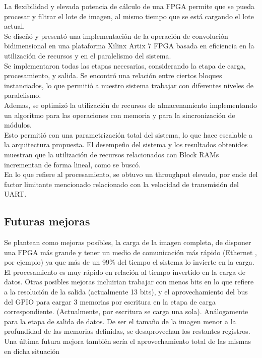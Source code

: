 \documentclass[a4paper]{article}
\begin{document}
La flexibilidad y elevada potencia de cálculo de una FPGA permite que se pueda
procesar y filtrar el lote de imagen, al mismo tiempo que se está cargando el lote
actual. \\

Se diseñó y presentó una implementación de la operación de convolución bidimensional en una
plataforma Xilinx Artix 7 FPGA basada en eficiencia en la utilización de recursos y en el paralelismo del sistema.\\
Se implementaron todas las etapas necesarias, considerando la etapa de carga, procesamiento, y salida. Se
encontró una relación entre ciertos bloques instanciados, lo que permitió a nuestro sistema trabajar con diferentes
niveles de paralelismo.\\

Ademas, se optimizó la utilización de recursos de almacenamiento implementando un algoritmo para las
operaciones con memoria y para la sincronización de módulos.\\
Esto permitió con una parametrización total del sistema, lo que hace escalable a la arquitectura propuesta.
El desempeño del sistema y los resultados obtenidos muestran que la utilización de recursos relacionados con
Block RAMs incrementan de forma lineal, como se buscó.\\

En lo que refiere al procesamiento, se obtuvo un throughput elevado, por ende del factor limitante mencionado relacionado 
con la velocidad de transmisión del UART.

\subsection{Futuras mejoras}
Se plantean como mejoras posibles, la carga de la imagen completa, de disponer una FPGA más grande y tener un medio de comunicación más rápido (Ethernet , por ejemplo) 
ya que más de un 99$\%$ del tiempo el sistema lo invierte en la carga. El procesamiento es muy rápido en relación al tiempo invertido en la carga de datos.
Otras posibles mejoras incluirian trabajar con menos bits en lo que refiere a la resolución de la salida (actualmente 13 bits),  y el aprovechamiento del bus del GPIO para cargar 3 memorias por escritura en la etapa 
de carga correspondiente. (Actualmente, por escritura se carga una sola). Análogamente para la etapa de salida de datos.
De ser el tamaño de la imagen menor a la profundidad de las memorias definidas, se desaprovechan los restantes registros. 
Una última  futura mejora también sería el aprovechamiento total de las mismas en dicha situación
\end{document}
